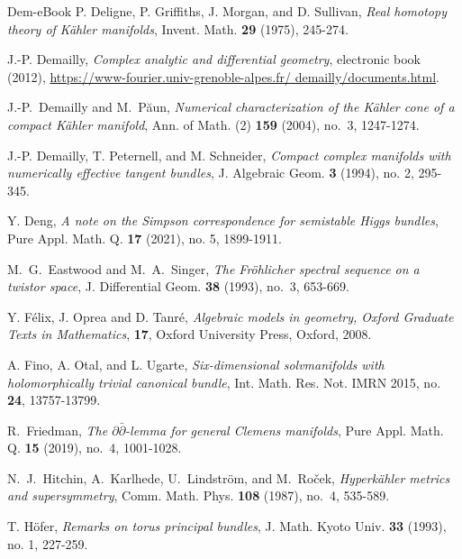 \documentclass[11pt]{amsart}
\numberwithin{equation}{section}
\theoremstyle{definition}
\theoremstyle{plain}
\theoremstyle{plain}
\theoremstyle{definition}
\theoremstyle{stepstyle}
\begin{document}
\begin{thebibliography}{Dem-eBook}
		P. Deligne, P. Griffiths, J. Morgan, and D. Sullivan,
		\newblock \textit{Real homotopy theory of K\"ahler manifolds},
		\newblock Invent. Math. \textbf{29} (1975), 245-274.
		
		J.-P. Demailly,
		\newblock \textit{Complex analytic and differential geometry},
		\newblock electronic book (2012),
		\url{https://www-fourier.univ-grenoble-alpes.fr/ demailly/documents.html}.
		
		
		J.-P.~Demailly and M.~P\u{a}un,
		\textit{Numerical characterization of the K\"ahler cone
			of a compact K\"ahler manifold},
		Ann. of Math. (2) \textbf{159} (2004), no.~3, 1247-1274.
		
		J.-P. Demailly, T. Peternell, and M. Schneider,
		\newblock \textit{Compact complex manifolds with numerically effective tangent bundles},
		\newblock J. Algebraic Geom. \textbf{3} (1994), no. 2, 295-345.
		
		
		
		Y. Deng,
		\newblock \textit{A note on the Simpson correspondence for semistable Higgs bundles},
		\newblock Pure Appl. Math. Q. \textbf{17} (2021), no. 5, 1899-1911.
		
		
		M.~G.~Eastwood and M.~A.~Singer,
		\textit{The Fr\"ohlicher spectral sequence on a twistor space},
		J. Differential Geom. \textbf{38} (1993), no.~3, 653-669.
		
		Y. F\'elix, J. Oprea and  D. Tanr\'e, \textit{Algebraic models in geometry, Oxford Graduate Texts in Mathematics}, \textbf{17}, Oxford University Press, Oxford, 2008.
		
		
		
		
		A. Fino, A. Otal, and L. Ugarte,
		\newblock \textit{Six-dimensional solvmanifolds with holomorphically trivial canonical bundle},
		\newblock Int. Math. Res. Not. IMRN 2015, no. \textbf{24}, 13757-13799.
		
		
		R.~Friedman,
		\textit{The $\partial\bar\partial$-lemma for general Clemens manifolds},
		Pure Appl. Math. Q. \textbf{15} (2019), no.~4, 1001-1028.
		
		
		N.~J.~Hitchin, A.~Karlhede, U.~Lindstr\"om, and M.~Ro\v{c}ek,
		\textit{Hyperk\"ahler metrics and supersymmetry},
		Comm. Math. Phys. \textbf{108} (1987), no.~4, 535-589.
		
		
		T. H\"ofer,
		\textit{Remarks on torus principal bundles},
		J. Math. Kyoto Univ. \textbf{33} (1993), no. 1, 227-259.
		

\end{thebibliography}
\end{document}

